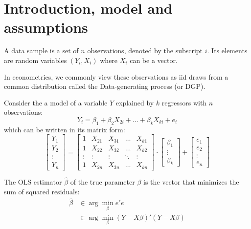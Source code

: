 \section{Introduction, model and assumptions}

\begin{definition}
A data sample is a set of $n$ observations, denoted by the subscript $i$. Its elements are random variables $(Y_i, X_i)$ where $X_i$ can be a vector.
\end{definition}

In econometrics, we commonly view these observations as iid draws from a common distribution called the Data-generating process (or DGP). 

Consider the a model of a variable $Y$ explained by $k$ regressors with $n$ observations: $$Y_i = \beta_1 + \beta_{2}X_{2i} + ... + \beta_kX_{ki} + e_i$$ which can be written in its matrix form:\[
\begin{bmatrix}
    Y_{1}\\
    Y_{2}\\
    \vdots\\
    Y_{n}
\end{bmatrix}
=
\begin{bmatrix}
    1       & X_{21} & X_{31} & \dots & X_{k1} \\
    1       & X_{22} & X_{32} & \dots & X_{k2} \\
    \vdots & \vdots & \vdots & \ddots & \vdots \\
    1       & X_{2n} & X_{3n} & \dots & X_{kn}
\end{bmatrix}
\cdot
\begin{bmatrix}
    \beta_1 \\
    \vdots \\
    \beta_k
\end{bmatrix}
+ 
\begin{bmatrix}
    e_{1}\\
    e_{2}\\
    \vdots\\
    e_{n}
\end{bmatrix}
\]
\begin{definition}
The OLS estimator $\hat\beta$ of the true parameter $\beta$ is the vector that minimizes the sum of squared residuals:\begin{align*}
\hat\beta & \in \operatorname{arg}\min_{\beta} e'e\\
& \in \operatorname{arg}\min_{\beta} (Y -  X\beta)'(Y -  X\beta)
\end{align*} 
\end{definition}

